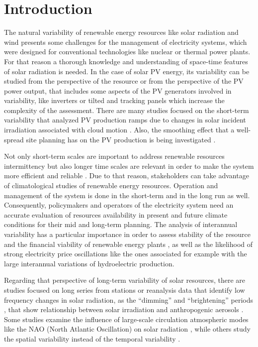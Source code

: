 \section{Introduction}

The natural variability of renewable energy resources like solar radiation and wind presents some challenges for the management of electricity systems, which were designed for conventional technologies like nuclear or thermal power plants. For that reason a thorough knowledge and understanding of space-time features of solar radiation is needed. In the case of solar PV energy,  its variability \cite*{Widen2015} can be studied from the perspective of the resource or from the perspective of the PV power output, that includes some aspects of the PV generators involved in variability, like inverters or tilted and tracking panels which increase the complexity of the assessment. There are many studies focused on the short-term variability \cite*{Zamo.Mestre.ea2014} that analyzed PV production ramps due to changes in solar incident irradiation associated with cloud motion \cite*{Cros2014, IEA-PVPS-T14-1.32015}. Also, the smoothing effect that a well-spread site planning has on the PV production is being investigated \cite*{Marcos2012, Perpinan.Marcos.ea2013}.

Not only short-term scales are important to address renewable resources intermittency but also longer time scales are relevant in order to make the system more efficient and reliable \cite*{Davy2012}. Due to that reason, stakeholders can take advantage of climatological studies of renewable energy resources. Operation and management of the system is done in the short-term and in the long run as well. Consequently, policymakers and operators of the electricity system need an accurate evaluation of resources availability in present and future climate conditions for their mid and long-term planning. The analysis of interannual variability has a particular importance in order to assess stability of the resource and the financial viability of renewable energy plants \cite*{pryor2006inter}, as well as the likelihood of strong electricity price oscillations like the ones associated for example with the large interannual variations of hydroelectric production.

Regarding that perspective of long-term variability of solar resources, there are studies focused on long series from stations \cite*{Sanchez-Lorenzo2009, Sanchez-Lorenzo2013, vazquez2012interannual} or reanalysis data that identify low frequency changes in solar radiation, as the “dimming” and “brightening” periods \cite*{Wild2005}, that show relationship between solar irradiation and anthropogenic aerosols \cite*{Nabat2015a}. Some studies examine the influence of large-scale circulation atmospheric modes like the NAO (North Atlantic Oscillation) on solar radiation \cite*{Pozo-Vazquez2004, Jerez2013}, while others study the spatial variability instead of the temporal variability \cite*{GueymardWilcox2011a}. 

